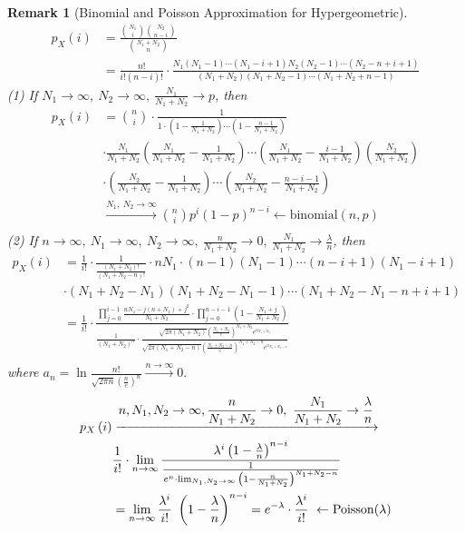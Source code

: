 \documentclass[openany,12pt]{book}
\newtheorem{remark}{Remark}[chapter]
\begin{document}
\begin{remark}[Binomial and Poisson Approximation for Hypergeometric]
$$
\begin{aligned}
p_X\left(i\right)&=\frac{\binom{N_1}{i}\binom{N_2}{n-i}}{\binom{N_1+N_2}{n}}\\
&=\frac{n!}{i!\left(n-i\right)!}\cdot\frac{N_1\left(N_1-1\right)\cdots\left(N_1-i+1\right)N_2\left(N_2-1\right)\cdots(N_2-n+i+1)}{\left(N_1+N_2\right)\left(N_1+N_2-1\right)\cdots(N_1+N_2+n-1)}
\end{aligned}
$$
(1) If $N_1\to\infty,\ N_2\to\infty,\ \frac{N_1}{N_1+N_2}\to p$, then
$$\begin{aligned}
p_X\left(i\right)&=\binom{n}{i}\cdot\frac{1}{1\cdot\left(1-\frac{1}{N_1+N_2}\right)\cdots\left(1-\frac{n-1}{N_1+N_2}\right)}\\
&\cdot\frac{N_1}{N_1+N_2}\left(\frac{N_1}{N_1+N_2}-\frac{1}{N_1+N_2}\right)\cdots\left(\frac{N_1}{N_1+N_2}-\frac{i-1}{N_1+N_2}\right)\left(\frac{N_2}{N_1+N_2}\right)\\
&\cdot\left(\frac{N_2}{N_1+N_2}-\frac{1}{N_1+N_2}\right)\cdots\left(\frac{N_2}{N_1+N_2}-\frac{n-i-1}{N_1+N_2}\right)\\
&\xrightarrow{N_1,\ N_2\to\infty}\binom{n}{i}p^i(1-p)^{n-i}\leftarrow\mathrm{binomial}(n,p)\\
\end{aligned}
$$
(2) If $n\to\infty,\ N_1\to\infty,\ N_2\to\infty,\ \frac{n}{N_1+N_2}\to0,\ \frac{N_1}{N_1+N_2}\to\frac{\lambda}{n}$, then
$$\begin{aligned}
p_X\left(i\right)&=\frac{1}{i!}\cdot\frac{1}{\frac{\left(N_1+N_2\right)!}{\left(N_1+N_2-n\right)!}}\cdot nN_1\cdot\left(n-1\right)\left(N_1-1\right)\cdots\left(n-i+1\right)\left(N_1-i+1\right)\\ 
&\cdot(N_1+N_2-N_1)(N_1+N_2-N_1-1)\cdots(N_1+N_2-N_1-n+i+1)
\\
&=\frac{1}{i!}\cdot\frac{\prod_{j=0}^{i-1}{\frac{nN_1-j\left(n+N_1\right)+j^2}{N_1+N_2}\cdot\prod_{j=0}^{n-i-1}\left(1-\frac{N_1+j}{N_1+N_2}\right)}}{\frac{1}{(N_1+N_2)^n}\cdot\frac{\sqrt{2\pi\left(N_1+N_2\right)}\left(\frac{N_1+N_2}{e}\right)^{N_1+N_2}e^{a_{N_1+N_2}}}{\sqrt{2\pi\left(N_1+N_2-n\right)}\left(\frac{N_1+N_2-n}{e}\right)^{N_1+N_2-n}e^{a_{N_1+N_2-n}}}}\\
\end{aligned}
$$
where $a_n=\ln{\frac{n!}{\sqrt{2\pi n}\left(\frac{n}{e}\right)^n}}\xrightarrow{n\to\infty}0.\ $
$$\begin{aligned}
p_X\left(i\right)&\xrightarrow{\dis n,N_1,N_2\to\infty,\frac{n}{N_1+N_2}\to0,\ \frac{N_1}{N_1+N_2}\to\frac{\lambda}{n}}\\
&\frac{1}{i!}\cdot\limn{\frac{\lambda^i\left(1-\frac{\lambda}{n}\right)^{n-i}}{\frac{1}{e^n\cdot\lim_{N_1,N_2\to\infty}{\left(1-\frac{n}{N_1+N_2}\right)^{N_1+N_2-n}}}}}\\
&=\lim_{n\to\infty}{\frac{\lambda^i}{i!}}\ \left(1-\frac{\lambda}{n}\right)^{n-i}=e^{-\lambda}\cdot\frac{\lambda^i}{i!}\ \leftarrow\mathrm{Poisson}(\lambda)\\
\end{aligned}
$$
\end{remark}
\end{document}

